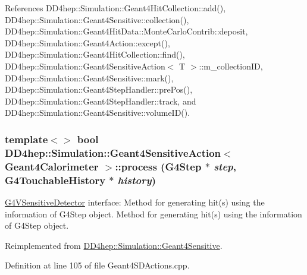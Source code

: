 References DD4hep::Simulation::Geant4HitCollection::add(), DD4hep::Simulation::Geant4Sensitive::collection(), DD4hep::Simulation::Geant4HitData::MonteCarloContrib::deposit, DD4hep::Simulation::Geant4Action::except(), DD4hep::Simulation::Geant4HitCollection::find(), DD4hep::Simulation::Geant4SensitiveAction$<$ T $>$::m\_\-collectionID, DD4hep::Simulation::Geant4Sensitive::mark(), DD4hep::Simulation::Geant4StepHandler::prePos(), DD4hep::Simulation::Geant4StepHandler::track, and DD4hep::Simulation::Geant4Sensitive::volumeID().\hypertarget{class_d_d4hep_1_1_simulation_1_1_geant4_sensitive_action_aca71f1e67794a93cd1682101b5c110f9}{
\subsubsection[{process}]{\setlength{\rightskip}{0pt plus 5cm}template$<$$>$ bool {\bf DD4hep::Simulation::Geant4SensitiveAction}$<$ {\bf Geant4Calorimeter} $>$::process (G4Step $\ast$ {\em step}, \/  G4TouchableHistory $\ast$ {\em history})}}
\label{class_d_d4hep_1_1_simulation_1_1_geant4_sensitive_action_aca71f1e67794a93cd1682101b5c110f9}


\hyperlink{class_g4_v_sensitive_detector}{G4VSensitiveDetector} interface: Method for generating hit(s) using the information of G4Step object. Method for generating hit(s) using the information of G4Step object. 

Reimplemented from \hyperlink{class_d_d4hep_1_1_simulation_1_1_geant4_sensitive_a9a9463a6c29a66dad43a52ffc9f7838d}{DD4hep::Simulation::Geant4Sensitive}.

Definition at line 105 of file Geant4SDActions.cpp.

